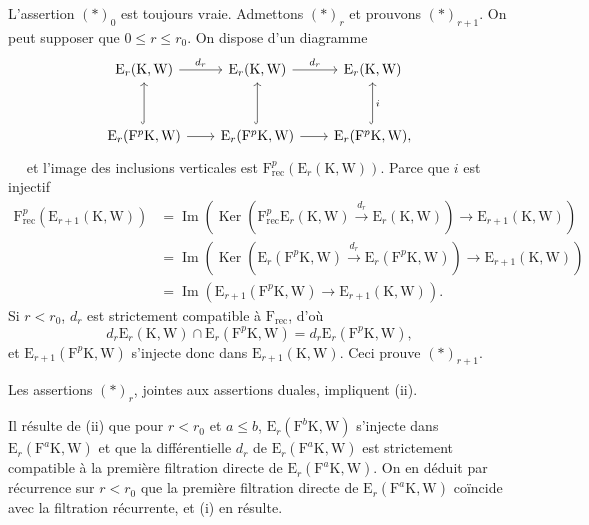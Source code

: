 \documentclass[11pt,leqno]{article}
\newcommand{\Page}[1]{\ifvmode\noindent\else\unskip\ \fi{\footnotesize\textcolor{gray}{[p.\,#1]}}\ \ignorespaces}
\begin{document}
L’assertion \((\ast)_0\) est toujours vraie. Admettons \((\ast)_r\) et prouvons \((\ast)_{r+1}\). On peut supposer que \(0\leq r\leq r_0\). On dispose d’un diagramme
\[
\begin{tikzcd}[column sep=2em,row sep=3em]
\mathrm{E}_r(\mathrm{K},\mathrm{W}) \arrow[r,"d_r"]
& \mathrm{E}_r(\mathrm{K},\mathrm{W}) \arrow[r,"d_r"]
& \mathrm{E}_r(\mathrm{K},\mathrm{W}) \\
\mathrm{E}_r(\mathrm{F}^p\mathrm{K},\mathrm{W}) \arrow[u,hook] \arrow[r]
& \mathrm{E}_r(\mathrm{F}^p\mathrm{K},\mathrm{W}) \arrow[u,hook] \arrow[r]
& \mathrm{E}_r(\mathrm{F}^p\mathrm{K},\mathrm{W}), \arrow[u,hook,"i"']
\end{tikzcd}
\]
\Page{27}
et l’image des inclusions verticales est \(\mathrm{F}_{\mathrm{rec}}^p(\mathrm{E}_r(\mathrm{K},\mathrm{W}))\). Parce que \(i\) est injectif
\begin{align*}
\mathrm{F}_{\mathrm{rec}}^p(\mathrm{E}_{r+1}(\mathrm{K},\mathrm{W}))
&=\operatorname{Im}(\operatorname{Ker}(
\mathrm{F}_{\mathrm{rec}}^p\mathrm{E}_r(\mathrm{K},\mathrm{W})
\xrightarrow{d_r}\mathrm{E}_r(\mathrm{K},\mathrm{W}))
\to\mathrm{E}_{r+1}(\mathrm{K},\mathrm{W}))\\
&=\operatorname{Im}(\operatorname{Ker}(
\mathrm{E}_r(\mathrm{F}^p\mathrm{K},\mathrm{W})
\xrightarrow{d_r}\mathrm{E}_r(\mathrm{F}^p\mathrm{K},\mathrm{W}))
\to\mathrm{E}_{r+1}(\mathrm{K},\mathrm{W}))\\
&=\operatorname{Im}(
\mathrm{E}_{r+1}(\mathrm{F}^p\mathrm{K},\mathrm{W})
\to\mathrm{E}_{r+1}(\mathrm{K},\mathrm{W})).
\end{align*}
Si \(r<r_0\), \(d_r\) est strictement compatible à \(\mathrm{F}_{\mathrm{rec}}\), d’où
\[
d_r\mathrm{E}_r(\mathrm{K},\mathrm{W})
\cap\mathrm{E}_r(\mathrm{F}^p\mathrm{K},\mathrm{W})
=d_r\mathrm{E}_r(\mathrm{F}^p\mathrm{K},\mathrm{W}),
\]
et \(\mathrm{E}_{r+1}(\mathrm{F}^p\mathrm{K},\mathrm{W})\) s’injecte donc dans \(\mathrm{E}_{r+1}(\mathrm{K},\mathrm{W})\). Ceci prouve \((\ast)_{r+1}\).

Les assertions \((\ast)_r\), jointes aux assertions duales, impliquent (ii).

Il résulte de (ii) que pour \(r<r_0\) et \(a\leq b\), \(\mathrm{E}_r(\mathrm{F}^b\mathrm{K},\mathrm{W})\) s’injecte dans \(\mathrm{E}_r(\mathrm{F}^a\mathrm{K},\mathrm{W})\) et que la différentielle \(d_r\) de \(\mathrm{E}_r(\mathrm{F}^a\mathrm{K},\mathrm{W})\) est strictement compatible à la première filtration directe de \(\mathrm{E}_r(\mathrm{F}^a\mathrm{K},\mathrm{W})\). On en déduit par récurrence sur \(r<r_0\) que la première filtration directe de \(\mathrm{E}_r(\mathrm{F}^a\mathrm{K},\mathrm{W})\) coïncide avec la filtration récurrente, et (i) en résulte.
\end{document}
